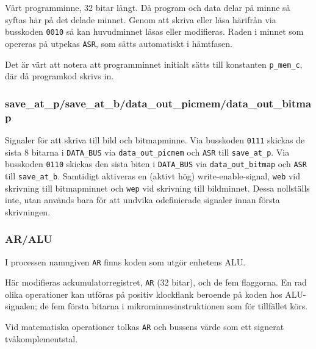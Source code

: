 \documentclass[]{article}
\begin{document}
Vårt programminne, 32 bitar långt. Då program och data delar på minne så syftas här på det delade minnet. Genom att skriva eller läsa härifrån via busskoden \texttt{0010} så kan huvudminnet läsas eller modifieras. Raden i minnet som opereras på utpekas \texttt{ASR}, som sätts automatiskt i hämtfasen.

Det är värt att notera att programminnet initialt sätts till konstanten \texttt{p\_mem\_c}, där då programkod skrivs in.

\subsubsection{save\_at\_p/save\_at\_b/data\_out\_picmem/data\_out\_bitmap}

Signaler för att skriva till bild och bitmapminne. Via busskoden \texttt{0111} skickas de sista 8 bitarna i \texttt{DATA\_BUS} via \texttt{data\_out\_picmem} och \texttt{ASR} till \texttt{save\_at\_p}. Via busskoden \texttt{0110} skickas den sista biten i \texttt{DATA\_BUS} via \texttt{data\_out\_bitmap} och \texttt{ASR} till \texttt{save\_at\_b}. Samtidigt aktiveras en (aktivt hög) write-enable-signal, \texttt{web} vid skrivning till bitmapminnet och \texttt{wep} vid skrivning till bildminnet. Dessa nollställs inte, utan används bara för att undvika odefinierade signaler innan första skrivningen.

\subsubsection{AR/ALU}

I processen namngiven \texttt{AR} finns koden som utgör enhetens ALU.

Här modifieras ackumulatorregistret, \texttt{AR} (32 bitar), och de fem flaggorna. En rad olika operationer kan utföras på positiv klockflank beroende på koden hos ALU-signalen; de fem första bitarna i mikrominnesinstruktionen som för tillfället körs.

Vid matematiska operationer tolkas \texttt{AR} och bussens värde som ett signerat tvåkomplementstal.
\end{document}
